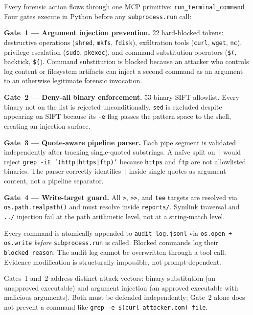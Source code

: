 \documentclass[sigconf, nonacm]{acmart}
\begin{document}
Every forensic action flows through one MCP primitive: \texttt{run\_terminal\_command}.
Four gates execute in Python before any \texttt{subprocess.run} call:

\textbf{Gate~1 --- Argument injection prevention.} 22 hard-blocked tokens:
destructive operations (\texttt{shred}, \texttt{mkfs}, \texttt{fdisk}), exfiltration
tools (\texttt{curl}, \texttt{wget}, \texttt{nc}), privilege escalation
(\texttt{sudo}, \texttt{pkexec}), and command substitution operators
(\texttt{\$(}, backtick, \texttt{\$\{}). Command substitution is blocked
because an attacker who controls log content or filesystem artifacts can inject
a second command as an argument to an otherwise legitimate forensic invocation.

\textbf{Gate~2 --- Deny-all binary enforcement.} 53-binary SIFT allowlist.
Every binary not on the list is rejected unconditionally. \texttt{sed} is
excluded despite appearing on SIFT because its \texttt{-e} flag passes the
pattern space to the shell, creating an injection surface.

\textbf{Gate~3 --- Quote-aware pipeline parser.} Each pipe segment is validated
independently after tracking single-quoted substrings. A na\"{i}ve split on
\texttt{|} would reject \texttt{grep -iE '(http|https|ftp)'} because
\texttt{https} and \texttt{ftp} are not allowlisted binaries. The parser
correctly identifies \texttt{|} inside single quotes as argument content, not
a pipeline separator.

\textbf{Gate~4 --- Write-target guard.} All \texttt{>}, \texttt{>>}, and
\texttt{tee} targets are resolved via \texttt{os.path.realpath()} and must
resolve inside \texttt{reports/}. Symlink traversal and \texttt{../} injection
fail at the path arithmetic level, not at a string-match level.

Every command is atomically appended to \texttt{audit\_log.jsonl} via
\texttt{os.open + os.write} \emph{before} \texttt{subprocess.run} is called.
Blocked commands log their \texttt{blocked\_reason}. The audit log cannot be
overwritten through a tool call. Evidence modification is structurally impossible,
not prompt-dependent.

Gates~1 and~2 address distinct attack vectors: binary substitution (an
unapproved executable) and argument injection (an approved executable with
malicious arguments). Both must be defended independently; Gate~2 alone does not
prevent a command like \texttt{grep -e \$(curl attacker.com) file}.

\end{document}

